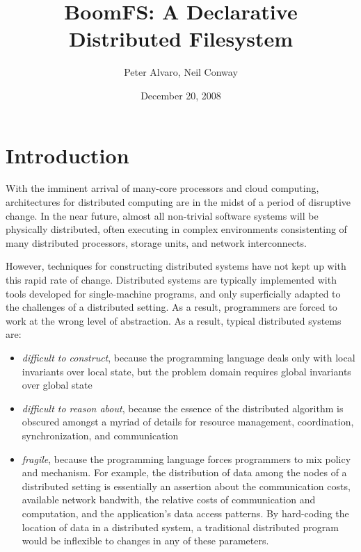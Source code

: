 \documentclass{article}
\title{BoomFS: A Declarative Distributed Filesystem}
\author{Peter Alvaro, Neil Conway}
\date{December 20, 2008}
\begin{document}
\maketitle
\begin{abstract}
\end{abstract}

\section{Introduction}
With the imminent arrival of many-core processors and cloud computing,
architectures for distributed computing are in the midst of a period
of disruptive change. In the near future, almost all non-trivial
software systems will be physically distributed, often executing in
complex environments consistenting of many distributed processors,
storage units, and network interconnects.

However, techniques for constructing distributed systems have not kept
up with this rapid rate of change. Distributed systems are typically
implemented with tools developed for single-machine programs, and only
superficially adapted to the challenges of a distributed setting. As a
result, programmers are forced to work at the wrong level of
abstraction. As a result, typical distributed systems are:
\begin{itemize}
\item \emph{difficult to construct}, because the programming language
  deals only with local invariants over local state, but the problem
  domain requires global invariants over global state

\item \emph{difficult to reason about}, because the essence of the
  distributed algorithm is obscured amongst a myriad of details for
  resource management, coordination, synchronization, and
  communication

\item
  \emph{fragile}, because the programming language forces programmers
  to mix policy and mechanism. For example, the distribution of data
  among the nodes of a distributed setting is essentially an assertion
  about the communication costs, available network bandwith, the
  relative costs of communication and computation, and the
  application's data access patterns. By hard-coding the location of
  data in a distributed system, a traditional distributed program
  would be inflexible to changes in any of these parameters.
\end{itemize}
\end{document}
